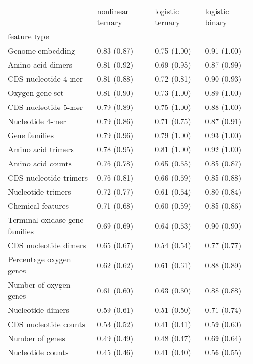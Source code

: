 \begin{tabular}{llll}
\toprule
 & nonlinear ternary & logistic ternary & logistic binary \\
feature type &  &  &  \\
\midrule
Genome embedding & 0.83 (0.87) & 0.75 (1.00) & 0.91 (1.00) \\
Amino acid dimers & 0.81 (0.92) & 0.69 (0.95) & 0.87 (0.99) \\
CDS nucleotide 4-mer & 0.81 (0.88) & 0.72 (0.81) & 0.90 (0.93) \\
Oxygen gene set & 0.81 (0.90) & 0.73 (1.00) & 0.89 (1.00) \\
CDS nucleotide 5-mer & 0.79 (0.89) & 0.75 (1.00) & 0.88 (1.00) \\
Nucleotide 4-mer & 0.79 (0.86) & 0.71 (0.75) & 0.87 (0.91) \\
Gene families & 0.79 (0.96) & 0.79 (1.00) & 0.93 (1.00) \\
Amino acid trimers & 0.78 (0.95) & 0.81 (1.00) & 0.92 (1.00) \\
Amino acid counts & 0.76 (0.78) & 0.65 (0.65) & 0.85 (0.87) \\
CDS nucleotide trimers & 0.76 (0.81) & 0.66 (0.69) & 0.85 (0.88) \\
Nucleotide trimers & 0.72 (0.77) & 0.61 (0.64) & 0.80 (0.84) \\
Chemical features & 0.71 (0.68) & 0.60 (0.59) & 0.85 (0.86) \\
Terminal oxidase gene families & 0.69 (0.69) & 0.64 (0.63) & 0.90 (0.90) \\
CDS nucleotide dimers & 0.65 (0.67) & 0.54 (0.54) & 0.77 (0.77) \\
Percentage oxygen genes & 0.62 (0.62) & 0.61 (0.61) & 0.88 (0.89) \\
Number of oxygen genes & 0.61 (0.60) & 0.63 (0.60) & 0.88 (0.88) \\
Nucleotide dimers & 0.59 (0.61) & 0.51 (0.50) & 0.71 (0.74) \\
CDS nucleotide counts & 0.53 (0.52) & 0.41 (0.41) & 0.59 (0.60) \\
Number of genes & 0.49 (0.49) & 0.48 (0.47) & 0.69 (0.64) \\
Nucleotide counts & 0.45 (0.46) & 0.41 (0.40) & 0.56 (0.55) \\
\bottomrule
\end{tabular}
